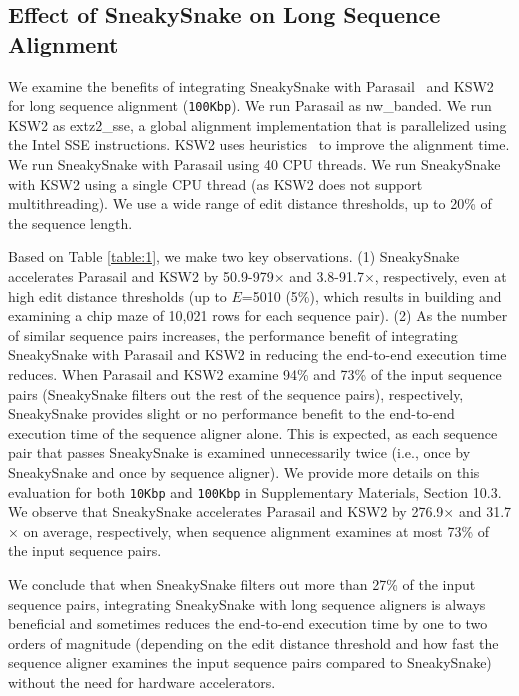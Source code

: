 {\subsection{{Effect} of SneakySnake on Long Sequence Alignment}
{We} examine the benefits of integrating SneakySnake with Parasail~\citep{daily2016parasail} and KSW2~\citep{suzuki2018introducing, li2018minimap2} {for long sequence alignment} (\texttt{100Kbp}). 
We run Parasail as nw\_banded. We run KSW2 as extz2\_sse, a global alignment implementation that is parallelized using the Intel SSE instructions{. KSW2} uses heuristics~\citep{suzuki2018introducing} to improve the alignment time. We run SneakySnake with Parasail using 40 CPU threads. We run SneakySnake with KSW2 using a single CPU thread (as KSW2 does not support multithreading). We use a wide range of edit distance thresholds, up to 20\% of the sequence length.

Based on Table \ref{table:1}, we make two key observations. (1) SneakySnake {accelerates} Parasail and KSW2 by 50.9-979$\times$ and 3.8-91.7$\times$, respectively, even at high edit distance thresholds (up to $E$=5010 (5\%), which results in building and examining a chip maze of 10,021 rows for each sequence pair).
(2) As the number of similar sequence pairs increases, the {performance benefit} of integrating SneakySnake with Parasail and KSW2 in reducing the end-to-end execution time {reduces}. 
{When Parasail and KSW2 examine 94\% and 73\% of the input sequence pairs (SneakySnake filters out the rest of the sequence pairs), respectively, SneakySnake provides slight or no performance benefit to the end-to-end execution time of the sequence aligner alone}. 
This is expected, as each sequence pair that passes SneakySnake is examined unnecessarily twice (i.e., once by SneakySnake and once by sequence aligner). We provide more details on this evaluation for both \texttt{10Kbp} and \texttt{100Kbp} in Supplementary Materials, Section 10.3.
We observe that SneakySnake accelerates Parasail and KSW2 by 276.9$\times$ and 31.7$\times$ on average, respectively, when {sequence alignment examines at most 73\% of the input sequence pairs}.

We conclude that {when SneakySnake filters out more than 27\% of the input sequence pairs, integrating SneakySnake with long sequence aligners is always beneficial and sometimes reduces the end-to-end execution time by one to two orders of magnitude (depending on the edit distance threshold and how fast the sequence aligner examines the input sequence pairs compared to SneakySnake) without the need for hardware accelerators}.


}
